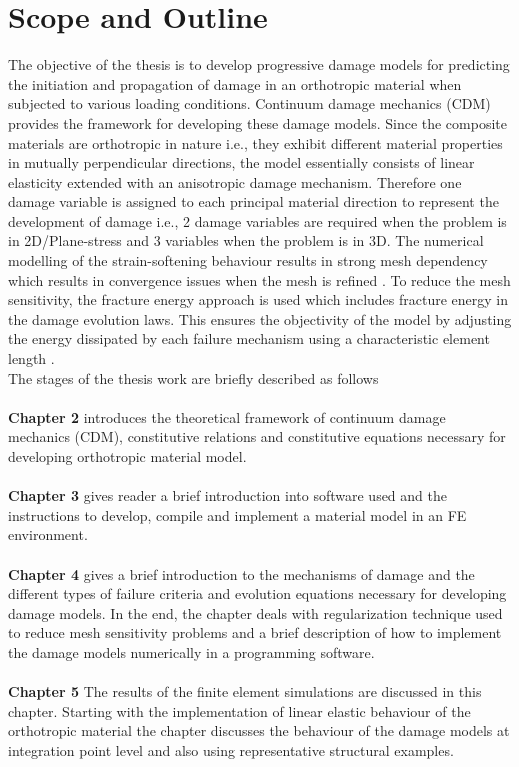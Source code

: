 \documentclass[12pt,a4paper,twoside,openright]{report}
\begin{document}
\section{Scope and Outline}
\indent\indent\indent  The objective of the thesis is to develop progressive damage models for predicting the initiation and propagation of damage in an orthotropic material when subjected to various loading conditions. Continuum damage mechanics (CDM) provides the framework for developing these damage models. Since the composite materials are orthotropic in nature i.e., they exhibit different material properties in mutually perpendicular directions, the model essentially consists of linear elasticity extended with an anisotropic damage mechanism. Therefore one damage variable is assigned to each principal material direction to represent the development of damage i.e., 2 damage variables are required when the problem is in 2D/Plane-stress  and 3 variables when the problem is in 3D. The numerical modelling of the strain-softening behaviour results in strong mesh dependency which results in convergence issues when the mesh is refined \citep{wang2009three}. To reduce the mesh sensitivity, the fracture energy approach is used which includes fracture energy in the damage evolution laws. This ensures the objectivity of the model by adjusting the energy dissipated by each failure mechanism using a characteristic element length \citep{falzon2011numerical}.\\
The stages of the thesis work are briefly described as follows\\\\
\textbf{Chapter 2} introduces the theoretical framework of continuum damage mechanics (CDM), constitutive relations and constitutive equations necessary for developing orthotropic material model. \\\\
\textbf{Chapter 3} gives reader a brief introduction into software used and the instructions to develop, compile and implement a material model in an FE environment. \\\\
\textbf{Chapter 4} gives a brief introduction to the mechanisms of damage and the different types of failure criteria and evolution equations necessary for developing damage models. In the end, the chapter deals with regularization technique used to reduce mesh sensitivity problems and a brief description of how to implement the damage models numerically in a programming software. \\\\
\textbf{Chapter 5} The results of the finite element simulations are discussed in this chapter. Starting with the implementation of linear elastic behaviour of the orthotropic material the chapter discusses the behaviour of the damage models at integration point level and also using representative structural examples.  
\end{document}
